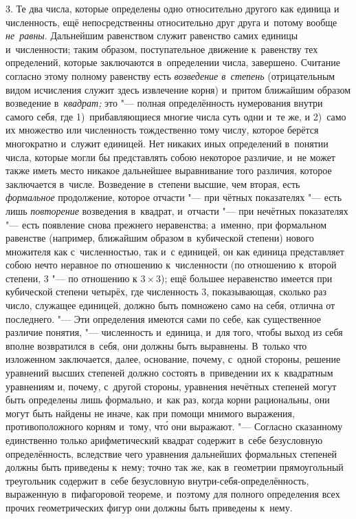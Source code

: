 3. Те два числа, которые определены одно относительно другого как единица и
численность, ещё непосредственны относительно друг друга и~потому вообще
{\em не~равны}. Дальнейшим равенством служит равенство самих единицы и~численности;
таким образом, поступательное движение к~равенству тех определений, которые
заключаются в~определении числа, завершено. Считание согласно этому полному
равенству есть {\em возведение в~степень} (отрицательным видом исчисления
служит здесь извлечение корня) и~притом ближайшим образом возведение
в~{\em квадрат;} это "--- полная определённость нумерования внутри самого
себя, где 1)~прибавляющиеся многие числа суть одни и~те же, и 2)~само
их множество или численность тождественно тому числу, которое берётся
многократно и~служит единицей. Нет никаких иных определений в~понятии числа,
которые могли бы представлять собою некоторое различие, и~не может также иметь
место никакое дальнейшее выравнивание того различия, которое заключается
в~числе. Возведение в~степени высшие, чем вторая, есть {\em формальное}
продолжение, которое отчасти "--- при чётных показателях "--- есть лишь
{\em повторение} возведения в~квадрат, и~отчасти "--- при нечётных показателях
"--- есть появление снова прежнего неравенства; а~именно, при формальном
равенстве (например, ближайшим образом в~кубической степени) нового множителя
как с~численностью, так и~с единицей, он как единица представляет собою нечто
неравное по отношению к~численности (по отношению к~второй степени, 3 "--- по
отношению к $3\times 3$); ещё большее неравенство имеется при кубической
степени четырёх, где численность 3, показывающая, сколько раз число, служащее
единицей, должно быть помножено само на себя, отлична от последнего. "--- Эти
определения имеются сами по себе, как существенное различие понятия, "---
численность и~единица, и~для того, чтобы выход из себя вполне возвратился
в~себя, они должны быть выравнены. В~только что изложенном заключается, далее,
основание, почему, с~одной стороны, решение уравнений высших степеней должно
состоять в~приведении их к~квадратным уравнениям и, почему, с~другой стороны,
уравнения нечётных степеней могут быть определены лишь формально, и~как раз,
когда корни рациональны, они могут быть найдены не иначе, как при помощи мнимого
выражения, противоположного корням и~тому, чт\'{о} они выражают. "--- Согласно
сказанному единственно только арифметический квадрат
содержит в~себе безусловную определённость, вследствие чего уравнения дальнейших
формальных степеней должны быть приведены к~нему; точно так же, как в~геометрии
прямоугольный треугольник содержит в~себе безусловную внутри-себя-определённость,
выраженную в~пифагоровой теореме, и~поэтому для полного определения всех прочих
геометрических фигур они должны быть приведены к~нему.

